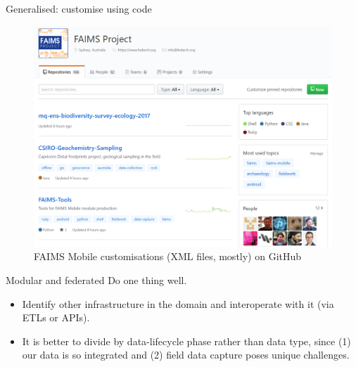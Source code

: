 \documentclass[aspectratio=169, 12pt]{beamer} %
\begin{document}
\begin{frame}{Generalised: customise using code}
 \begin{figure}[H]
    \centering
        \includegraphics[height=.75\textheight]{figures/FAIMS-generalised.png}
        \caption{FAIMS Mobile customisations (XML files, mostly) on GitHub}
        \label{fig:figure11}
 \end{figure}
\end{frame}

\begin{frame}{Modular and federated}
  Do one thing well.
      \begin{itemize}[label=\textbullet]
        \item Identify other infrastructure in the domain and interoperate with it (via ETLs or APIs).
        \item It is better to divide by data-lifecycle phase rather than data type, since (1) our data is so integrated and (2) field data capture poses unique challenges.
    \end{itemize}
\end{frame}
\end{document}
